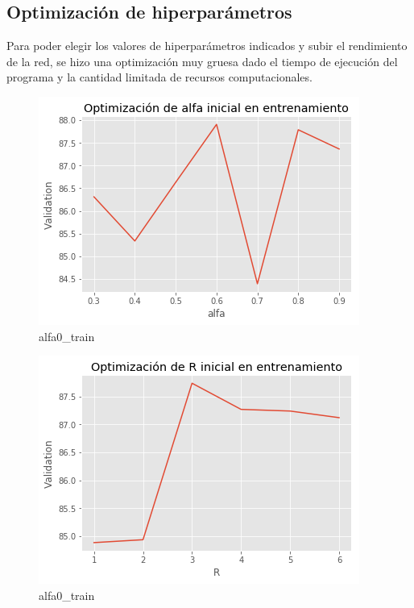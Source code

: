 \documentclass[
]{article}
\begin{document}
\hypertarget{optimizaciuxf3n-de-hiperparuxe1metros}{%
\subsection{Optimización de
hiperparámetros}\label{optimizaciuxf3n-de-hiperparuxe1metros}}

Para poder elegir los valores de hiperparámetros indicados y subir el
rendimiento de la red, se hizo una optimización muy gruesa dado el
tiempo de ejecución del programa y la cantidad limitada de recursos
computacionales.

\begin{figure}
\centering
\includegraphics{kohonen_tests/alfa0_train.png}
\caption{alfa0\_train}
\end{figure}

\begin{figure}
\centering
\includegraphics{kohonen_tests/r0_train.png}
\caption{alfa0\_train}
\end{figure}
\end{document}
